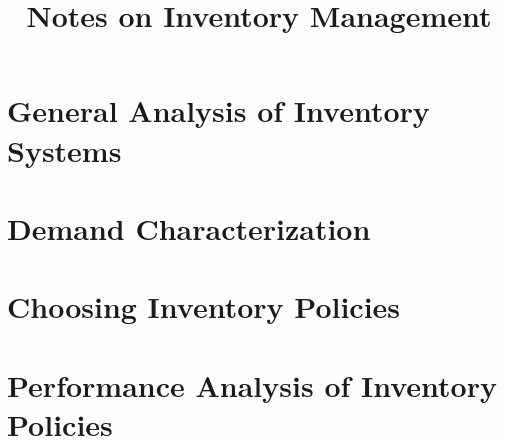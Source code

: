 \documentclass[a4paper,12pt]{scrartcl}
\title{Notes on Inventory Management}
\begin{document}
\maketitle
\tableofcontents

\section{General Analysis of Inventory Systems}


\section{Demand Characterization}
\label{sec:character}
%

\section{Choosing Inventory Policies}
% 
% 
% 
% 
% 
% 

\section{Performance Analysis of Inventory Policies}
%



%
%
\end{document}
